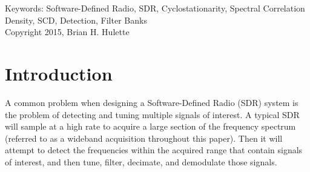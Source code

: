 \documentclass[12pt]{article}
\begin{document}
\begin{center}
Keywords: Software-Defined Radio, SDR, Cyclostationarity, Spectral Correlation Density, SCD, Detection, Filter Banks
\\
Copyright 2015, Brian H. Hulette
\end{center}

\vfill



\pagebreak

%
%

\tableofcontents
\pagebreak

\listoffigures
\pagebreak


\pagestyle{myheadings}

\section{Introduction}
\label{sec:intro}

A common problem when designing a Software-Defined Radio (SDR) system is the
problem of detecting and tuning multiple signals of interest. A typical SDR will sample
at a high rate to acquire a large section of the frequency spectrum (referred
to as a wideband acquisition throughout this paper). Then it will attempt to
detect the frequencies within the acquired range that contain signals of
interest, and then tune, filter, decimate, and demodulate those signals. 
\end{document}
